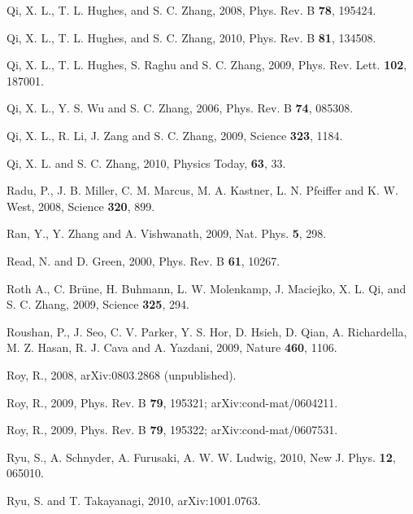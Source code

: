 \documentclass[twocolumn,floatfix,showpacs,rmp,aps]{revtex4}
\begin{document}
\begin{thebibliography}{99}
Qi, X. L., T. L. Hughes, and S. C. Zhang, 2008,
Phys. Rev. B {\bf 78}, 195424.

Qi, X. L., T. L. Hughes, and S. C. Zhang, 2010,
Phys. Rev. B {\bf 81}, 134508.

Qi, X. L., T. L. Hughes, S. Raghu and S. C. Zhang, 2009,
Phys. Rev. Lett. {\bf 102}, 187001.

Qi, X. L., Y. S. Wu and S. C. Zhang, 2006,
Phys. Rev. B {\bf 74}, 085308.

Qi, X. L., R. Li, J. Zang and S. C. Zhang, 2009,
Science {\bf 323}, 1184.

Qi, X. L. and S. C. Zhang, 2010,
Physics Today, {\bf 63}, 33.

Radu, P., J. B. Miller, C. M. Marcus, M. A. Kastner, L. N. Pfeiffer and K. W. West, 2008,
Science {\bf 320}, 899.

Ran, Y., Y. Zhang and A. Vishwanath, 2009,
Nat. Phys. {\bf 5}, 298.

Read, N. and D. Green, 2000,
Phys. Rev. B {\bf 61}, 10267.

Roth A., C. Br\"une, H. Buhmann, L. W. Molenkamp, J. Maciejko, X. L. Qi, and S. C. Zhang, 2009,
Science {\bf 325}, 294.

Roushan, P., J. Seo, C. V. Parker, Y. S. Hor, D. Hsieh, D. Qian, A. Richardella, M. Z. Hasan,
R. J. Cava and A. Yazdani, 2009,
Nature {\bf 460}, 1106.

Roy, R., 2008,
arXiv:0803.2868 (unpublished).

Roy, R., 2009,
Phys. Rev. B {\bf 79}, 195321; arXiv:cond-mat/0604211.

Roy, R., 2009,
Phys. Rev. B {\bf 79}, 195322; arXiv:cond-mat/0607531.

Ryu, S., A. Schnyder, A. Furusaki, A. W. W.  Ludwig, 2010,
New J. Phys. {\bf 12}, 065010.

Ryu, S. and T. Takayanagi, 2010,
arXiv:1001.0763.


\end{thebibliography}
\end{document}

